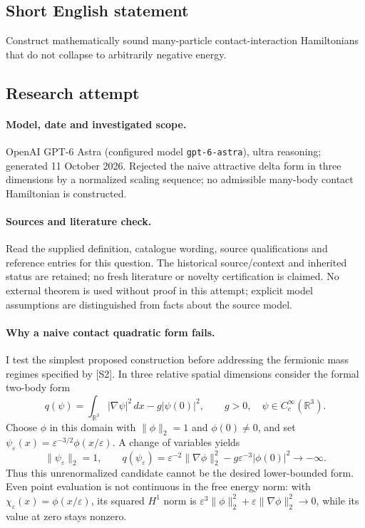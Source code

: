 \documentclass[11pt]{article}
\begin{document}
\subsection{Short English statement}
Construct mathematically sound many-particle contact-interaction Hamiltonians that do not collapse to arbitrarily negative energy.
\subsection{Research attempt}
\paragraph{Model, date and investigated scope.}
OpenAI GPT-6 Astra (configured model \texttt{gpt-6-astra}), ultra reasoning; generated 11 October 2026. Rejected the naive attractive delta form in three dimensions by a normalized scaling sequence; no admissible many-body contact Hamiltonian is constructed.

\paragraph{Sources and literature check.}
Read the supplied definition, catalogue wording, source qualifications and reference entries for this question. The historical source/context and inherited status are retained; no fresh literature or novelty certification is claimed. No external theorem is used without proof in this attempt; explicit model assumptions are distinguished from facts about the source model.

\paragraph{Why a naive contact quadratic form fails.} I test the simplest proposed construction before addressing the fermionic mass regimes specified by [S2]. In three relative spatial dimensions consider the formal two-body form
\[
 q(\psi)=\int_{\mathbb R^3}|\nabla\psi|^2\,dx-g|\psi(0)|^2,
 \qquad g>0,\quad\psi\in C_c^\infty(\mathbb R^3).
\]
Choose \(\phi\) in this domain with \(\|\phi\|_2=1\) and \(\phi(0)\ne0\), and set \(\psi_\varepsilon(x)=\varepsilon^{-3/2}\phi(x/\varepsilon)\). A change of variables yields
\[
 \|\psi_\varepsilon\|_2=1,\qquad
 q(\psi_\varepsilon)=\varepsilon^{-2}\|\nabla\phi\|_2^2-g\varepsilon^{-3}|\phi(0)|^2\longrightarrow-\infty.
\]
Thus this unrenormalized candidate cannot be the desired lower-bounded form. Even point evaluation is not continuous in the free energy norm: with \(\chi_\varepsilon(x)=\phi(x/\varepsilon)\), its squared \(H^1\) norm is \(\varepsilon^3\|\phi\|_2^2+\varepsilon\|\nabla\phi\|_2^2\to0\), while its value at zero stays nonzero.
\end{document}
